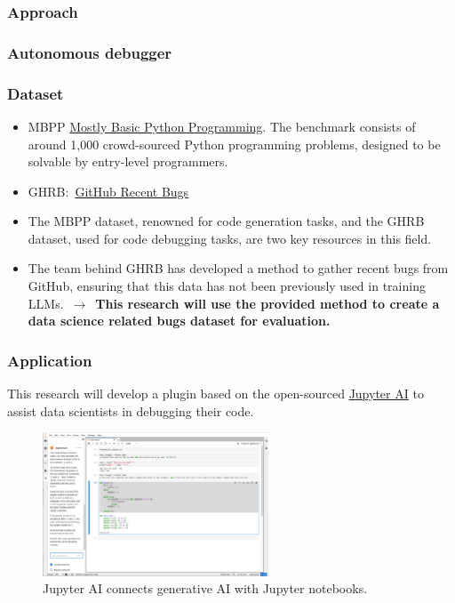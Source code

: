 \documentclass{beamer}
\begin{document}
\begin{frame}[allowframebreaks]
\frametitle{Approach}
\end{frame}

\begin{frame}[allowframebreaks]
\frametitle{Autonomous debugger}
\end{frame}

\begin{frame}[allowframebreaks]
\frametitle{Dataset}
\begin{itemize}
  \item MBPP \href{https://huggingface.co/datasets/mbpp}{Mostly Basic Python Programming}. The benchmark consists of around 1,000 crowd-sourced Python programming problems, designed to be solvable by entry-level programmers.~\cite{austin2021program}
  \item GHRB:~\href{https://github.com/coinse/GHRB}{GitHub Recent Bugs}~\cite{lee2023github}
  \item The MBPP dataset, renowned for code generation tasks, and the GHRB dataset, used for code debugging tasks, are two key resources in this field.
  \item The team behind GHRB has developed a method to gather recent bugs from GitHub, ensuring that this data has not been previously used in training LLMs.~$\rightarrow$~\textbf{This research will use the provided method to create a data science related bugs dataset for evaluation.}
\end{itemize}
\end{frame}

\begin{frame}[allowframebreaks]
\frametitle{Application}
This research will develop a plugin based on the open-sourced \href{https://github.com/jupyterlab/jupyter-ai?tab=readme-ov-file}{Jupyter AI} to assist data scientists in debugging their code.
\begin{figure}
  \centering
  \includegraphics[width=0.6\textwidth]{img/jupyter_ai_screenshot.png}
  \caption{Jupyter AI connects generative AI with Jupyter notebooks.}\label{fig:jupyter_ai_screenshot}
\end{figure}
\end{frame}
\end{document}
